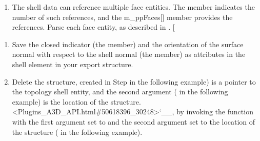 \documentclass[letterpaper,12pt,english,openany,oneside]{sphinxmanual}
\begin{document}
\begin{sphinxVerbatim}[commandchars=\\\{\}]
 
    
\end{sphinxVerbatim}
\begin{enumerate}
%
\setcounter{enumi}{2}
\item {} 
The shell data can reference multiple face entities. The  member indicates the number of such references, and the m\_ppFaces{[}{]} member provides the references. Parse each face entity, as described in . {[}

\end{enumerate}

\begin{sphinxVerbatim}[commandchars=\\\{\}]
       
   \PYG{p}{[}\PYG{p}{]}
\end{sphinxVerbatim}
\begin{enumerate}
%
\setcounter{enumi}{3}
\item {} 
Save the closed indicator (the  member) and the orientation of the surface normal with respect to the shell normal (the  member) as attributes in the shell element in your export structure.

\item {} 
Delete the  structure, created in Step  in the following example) is a pointer to the topology shell entity, and the second argument ( in the following example) is the location of the  structure. <Plugins\_A3D\_API.html\#50618396\_30248>`\_\_, by invoking the  function with the first argument set to  and the second argument set to the location of the structure ( in the following example).

\end{enumerate}
\end{document}
